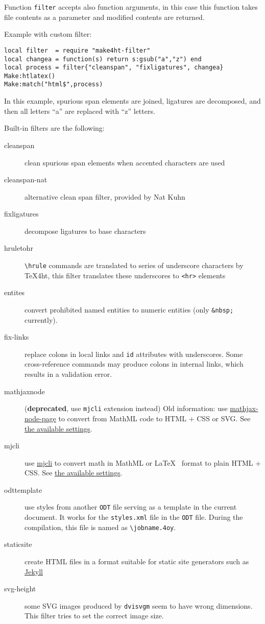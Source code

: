 Function \texttt{filter} accepts also function arguments, in this case
this function takes file contents as a parameter and modified contents
are returned.

Example with custom filter:

\begin{verbatim}
local filter  = require "make4ht-filter"
local changea = function(s) return s:gsub("a","z") end
local process = filter{"cleanspan", "fixligatures", changea}
Make:htlatex()
Make:match("html$",process)
\end{verbatim}

In this example, spurious span elements are joined, ligatures are
decomposed, and then all letters ``a'' are replaced with ``z'' letters.

Built-in filters are the following:

\begin{description}
\item[cleanspan]
clean spurious span elements when accented characters are used
\item[cleanspan-nat]
alternative clean span filter, provided by Nat Kuhn
\item[fixligatures]
decompose ligatures to base characters
\item[hruletohr]
\texttt{\textbackslash{}hrule} commands are translated to series of
underscore characters by \TeX4ht, this filter translates these
underscores to \texttt{\textless{}hr\textgreater{}} elements
\item[entites]
convert prohibited named entities to numeric entities (only
\texttt{\&nbsp;} currently).
\item[fix-links]
replace colons in local links and \texttt{id} attributes with
underscores. Some cross-reference commands may produce colons in
internal links, which results in a validation error.
\item[mathjaxnode]
(\textbf{deprecated}, use \texttt{mjcli} extension instead) Old
information: use
\href{https://github.com/pkra/mathjax-node-page/}{mathjax-node-page} to
convert from MathML code to HTML + CSS or SVG. See
\protect\hyperlink{mathjaxsettings}{the available settings}.
\item[mjcli]
use \href{https://github.com/michal-h21/mjcli}{mjcli} to convert math in
MathML or \LaTeX~ format to plain HTML + CSS. See
\protect\hyperlink{mathjaxsettings}{the available settings}.
\item[odttemplate]
use styles from another \texttt{ODT} file serving as a template in the
current document. It works for the \texttt{styles.xml} file in the
\texttt{ODT} file. During the compilation, this file is named as
\texttt{\textbackslash{}jobname.4oy}. \label{sec:odttemplate}
\item[staticsite]
create HTML files in a format suitable for static site generators such
as \href{https://jekyllrb.com/}{Jekyll}
\item[svg-height]
some SVG images produced by \texttt{dvisvgm} seem to have wrong
dimensions. This filter tries to set the correct image size.
\end{description}


